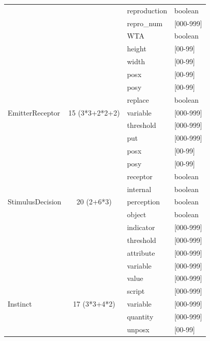 \documentclass[11pt,twoside,a4paper]{article}
\begin{document}
\begin{table}[h]
\begin{center}
\begin{scriptsize}
\begin{tabular}{|p{}|c|p{}|p{}|}
	\cline{3-4} %
								&				&	reproduction& boolean \\
	\cline{3-4} %
								&				&	repro\_num	& [000-999] \\
	\cline{3-4} %
								&				&	WTA			& boolean \\
	\cline{3-4} %
								&				&	height		& [00-99] \\
	\cline{3-4} %
								&				&	width		& [00-99] \\
	\cline{3-4} %
								&				&	posx		& [00-99] \\
	\cline{3-4} %
								&				&	posy		& [00-99] \\
	\cline{3-4} %
								&				&	replace		& boolean \\
	\hline \hline
	EmitterReceptor						& 15 (3*3+2*2+2)&	variable	& [000-999] \\
	\cline{3-4} %
								&				&	threshold	& [000-999] \\
	\cline{3-4} %
								&				&	put		& [000-999] \\
	\cline{3-4} %
								&				&	posx		& [00-99] \\
	\cline{3-4} %
								&				&	posy		& [00-99] \\
	\cline{3-4} %
								&				&	receptor	& boolean \\
	\cline{3-4} %
								&				&	internal	& boolean	\\
	\hline \hline
	StimulusDecision					&	20 (2+6*3)	&	perception	& boolean \\
	\cline{3-4} %
								&				&	object		& boolean \\
	\cline{3-4} %
								&				&	indicator	& [000-999] \\
	\cline{3-4} %
								&				&	threshold	& [000-999] \\
	\cline{3-4} %
								&				&	attribute	& [000-999] \\
	\cline{3-4} %
								&				&	variable	& [000-999] \\
	\cline{3-4} %
								&				&	value		& [000-999] \\
	\cline{3-4} %
								&				&	script		& [000-999] \\
	\hline \hline
	Instinct						&	17 (3*3+4*2)&	variable	& [000-999] \\
	\cline{3-4} %
								&				&	quantity	& [000-999] \\
	\cline{3-4} %
								&				&	unposx		& [00-99] \\

\end{tabular}
\end{scriptsize}
\end{center}
\end{table}
\end{document}
